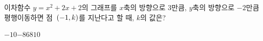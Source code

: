이차함수 $y=x^2+2x+2$의 그래프를 $x$축의 방향으로 $3$만큼, $y$축의 방향으로 $-2$만큼 평행이동하면 점~$(-1{,}\mkern3mu k)$를 지난다고 할 때, $k$의 값은?
\begin{choices32}{$-10$}{$-8$}{$6$}{$8$}{$10$}\end{choices32}
